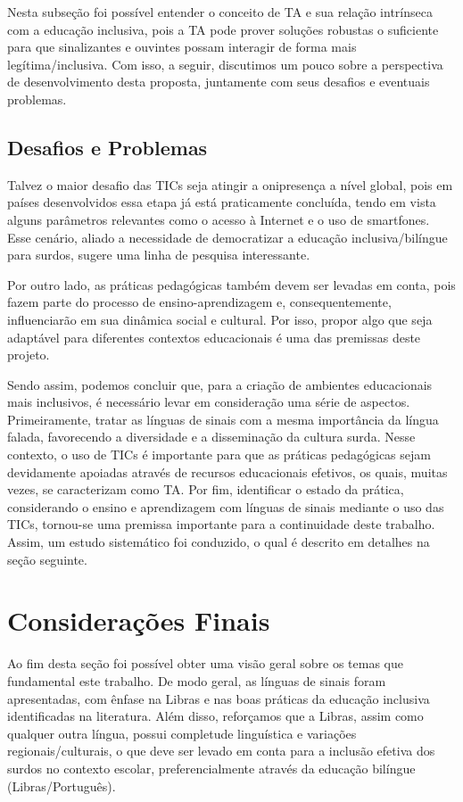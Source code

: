 Nesta subseção foi possível entender o conceito de TA e sua relação intrínseca com a educação inclusiva, pois a TA pode prover soluções robustas o suficiente para que sinalizantes e ouvintes possam interagir de forma mais legítima/inclusiva. Com isso, a seguir, discutimos um pouco sobre a perspectiva de desenvolvimento desta proposta, juntamente com seus desafios e eventuais problemas.

\subsection{Desafios e Problemas}
\label{fundamentacao-teorica:tic:desafios}

Talvez o maior desafio das TICs seja atingir a onipresença a nível global, pois em países desenvolvidos  essa etapa já está praticamente concluída, tendo em vista alguns parâmetros relevantes como o acesso à Internet e o uso de smartfones. Esse cenário, aliado a necessidade de democratizar a educação inclusiva/bilíngue para surdos, sugere uma linha de pesquisa interessante.

Por outro lado, as práticas pedagógicas também devem ser levadas em conta, pois fazem parte do processo de ensino-aprendizagem e, consequentemente, influenciarão em sua dinâmica social e cultural. Por isso, propor algo que seja adaptável para diferentes contextos educacionais é uma das premissas deste projeto.

Sendo assim, podemos concluir que, para a criação de ambientes educacionais mais inclusivos, é necessário levar em consideração uma série de aspectos. Primeiramente, tratar as línguas de sinais com a mesma importância da língua falada, favorecendo a diversidade e a disseminação da cultura surda. Nesse contexto, o uso de TICs é importante para que as práticas pedagógicas sejam devidamente apoiadas através de recursos educacionais efetivos, os quais, muitas vezes, se caracterizam como TA. Por fim, identificar o estado da prática, considerando o ensino e aprendizagem com línguas de sinais mediante o uso das TICs, tornou-se uma premissa importante para a continuidade deste trabalho. Assim, um estudo sistemático foi conduzido, o qual é descrito em detalhes na seção seguinte.

\section{Considerações Finais}
\label{fundamentacao-teorica:fim}

Ao fim desta seção foi possível obter uma visão geral sobre os temas que fundamental este trabalho. De modo geral, as línguas de sinais foram apresentadas, com ênfase na Libras e nas boas práticas da educação inclusiva identificadas na literatura. Além disso, reforçamos que a Libras, assim como qualquer outra língua, possui completude linguística e variações regionais/culturais, o que deve ser levado em conta para a inclusão efetiva dos surdos no contexto escolar, preferencialmente através da educação bilíngue (Libras/Português).


